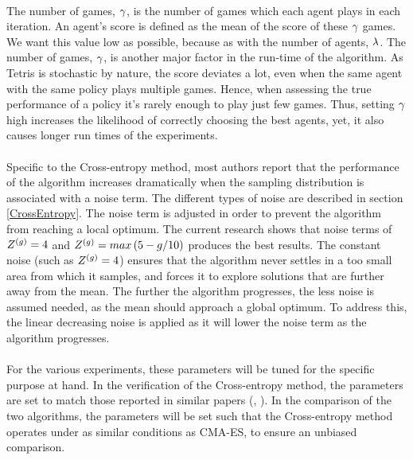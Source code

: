\\
The number of games, $\gamma$, 
is the number of games  which each agent 
plays in each iteration. An agent's score is defined as the 
mean of the score of these 
$\gamma$ games.
We want this value low as possible, because as with the number of
agents, $\lambda$. The number of games, $\gamma$, 
is another major factor in the run-time of the algorithm.
As Tetris is stochastic by nature, the score deviates a lot, 
even when the
same agent with the same policy plays multiple games. 
Hence, when assessing the true
performance of a policy it's rarely enough to play just few games. Thus, setting 
$\gamma$ high increases the likelihood of correctly choosing the best 
agents, yet, it also causes longer run times of the experiments.\\
\\
Specific to the Cross-entropy method, 
most authors report that the performance of the 
algorithm increases dramatically when the sampling 
distribution is associated with
a noise term. The different types of 
noise are described in section \ref{CrossEntropy}.
The noise term is adjusted in order to 
prevent the algorithm from reaching a local optimum.
The current research shows that noise terms of $Z^{(g)} = 4$ and 
$Z^{(g)} = max \left( 5 - g / 10 \right)$ 
\citep{thiery:09} produces the best results.
The constant noise (such as $Z^{(g)} = 4$) ensures that the algorithm
never settles in a too small area from which it samples, and forces it to explore
solutions that are further away from the mean. The further the 
algorithm progresses, 
the less noise is assumed needed, as the mean should approach a global optimum. To
address this, the linear decreasing noise 
is applied as it will lower the noise term
as the algorithm progresses.\\
\\
For the various experiments, these 
parameters will be tuned for the specific purpose 
at hand. In the verification of the Cross-entropy method, the parameters are set 
to match those reported in similar papers (\cite{thiery:09}, \cite{szita:06}).
In the comparison of the two algorithms, the parameters will be set such that 
the Cross-entropy method operates under as 
similar conditions as CMA-ES, to ensure an unbiased
comparison.





